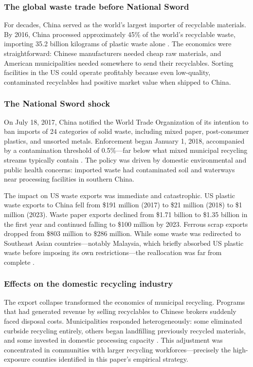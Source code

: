 \documentclass[12pt]{article}
\begin{document}
\subsubsection*{The global waste trade before National Sword} For decades, China served as the world's largest importer of recyclable materials. By 2016, China processed approximately 45\% of the world's recyclable waste, importing 35.2 billion kilograms of plastic waste alone \citep{Brooks2018}. The economics were straightforward: Chinese manufacturers needed cheap raw materials, and American municipalities needed somewhere to send their recyclables. Sorting facilities in the US could operate profitably because even low-quality, contaminated recyclables had positive market value when shipped to China.

\subsubsection*{The National Sword shock} On July 18, 2017, China notified the World Trade Organization of its intention to ban imports of 24 categories of solid waste, including mixed paper, post-consumer plastics, and unsorted metals. Enforcement began January 1, 2018, accompanied by a contamination threshold of 0.5\%---far below what mixed municipal recycling streams typically contain \citep{Huang2020}. The policy was driven by domestic environmental and public health concerns: imported waste had contaminated soil and waterways near processing facilities in southern China.

The impact on US waste exports was immediate and catastrophic. US plastic waste exports to China fell from \$191 million (2017) to \$21 million (2018) to \$1 million (2023). Waste paper exports declined from \$1.71 billion to \$1.35 billion in the first year and continued falling to \$100 million by 2023. Ferrous scrap exports dropped from \$803 million to \$286 million. While some waste was redirected to Southeast Asian countries---notably Malaysia, which briefly absorbed US plastic waste before imposing its own restrictions---the reallocation was far from complete \citep{Yamaguchi2022}.

\subsubsection*{Effects on the domestic recycling industry} The export collapse transformed the economics of municipal recycling. Programs that had generated revenue by selling recyclables to Chinese brokers suddenly faced disposal costs. Municipalities responded heterogeneously: some eliminated curbside recycling entirely, others began landfilling previously recycled materials, and some invested in domestic processing capacity \citep{Kinnaman2014}. This adjustment was concentrated in communities with larger recycling workforces---precisely the high-exposure counties identified in this paper's empirical strategy.
\end{document}
